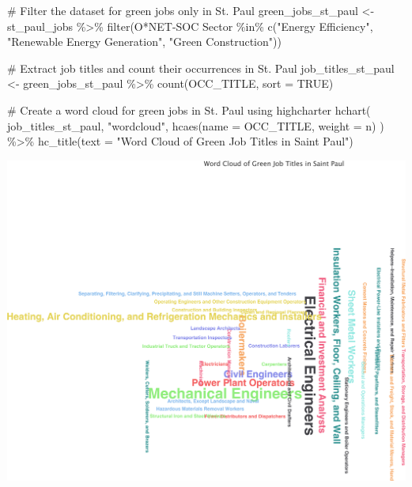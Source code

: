\documentclass[
  letterpaper,
  DIV=11,
  numbers=noendperiod]{scrartcl}
\newenvironment{Shaded}{\begin{snugshade}}{\end{snugshade}}
\newcommand{\AttributeTok}[1]{\textcolor[rgb]{0.40,0.45,0.13}{#1}}
\newcommand{\CommentTok}[1]{\textcolor[rgb]{0.37,0.37,0.37}{#1}}
\newcommand{\ConstantTok}[1]{\textcolor[rgb]{0.56,0.35,0.01}{#1}}
\newcommand{\FunctionTok}[1]{\textcolor[rgb]{0.28,0.35,0.67}{#1}}
\newcommand{\NormalTok}[1]{\textcolor[rgb]{0.00,0.23,0.31}{#1}}
\newcommand{\OtherTok}[1]{\textcolor[rgb]{0.00,0.23,0.31}{#1}}
\newcommand{\SpecialCharTok}[1]{\textcolor[rgb]{0.37,0.37,0.37}{#1}}
\newcommand{\StringTok}[1]{\textcolor[rgb]{0.13,0.47,0.30}{#1}}
\begin{document}
\begin{Shaded}
\begin{Highlighting}[]
\CommentTok{\# Filter the dataset for green jobs only in St. Paul}
\NormalTok{green\_jobs\_st\_paul }\OtherTok{\textless{}{-}}\NormalTok{ st\_paul\_jobs }\SpecialCharTok{\%\textgreater{}\%}
  \FunctionTok{filter}\NormalTok{(}\StringTok{\textasciigrave{}}\AttributeTok{O*NET{-}SOC Sector}\StringTok{\textasciigrave{}} \SpecialCharTok{\%in\%} \FunctionTok{c}\NormalTok{(}\StringTok{"Energy Efficiency"}\NormalTok{, }\StringTok{"Renewable Energy Generation"}\NormalTok{, }\StringTok{"Green Construction"}\NormalTok{))}

\CommentTok{\# Extract job titles and count their occurrences in St. Paul}
\NormalTok{job\_titles\_st\_paul }\OtherTok{\textless{}{-}}\NormalTok{ green\_jobs\_st\_paul }\SpecialCharTok{\%\textgreater{}\%}
  \FunctionTok{count}\NormalTok{(OCC\_TITLE, }\AttributeTok{sort =} \ConstantTok{TRUE}\NormalTok{)}

\CommentTok{\# Create a word cloud for green jobs in St. Paul using highcharter}
\FunctionTok{hchart}\NormalTok{(}
\NormalTok{  job\_titles\_st\_paul, }
  \StringTok{"wordcloud"}\NormalTok{, }
  \FunctionTok{hcaes}\NormalTok{(}\AttributeTok{name =}\NormalTok{ OCC\_TITLE, }\AttributeTok{weight =}\NormalTok{ n)}
\NormalTok{) }\SpecialCharTok{\%\textgreater{}\%}
  \FunctionTok{hc\_title}\NormalTok{(}\AttributeTok{text =} \StringTok{"Word Cloud of Green Job Titles in Saint Paul"}\NormalTok{)}
\end{Highlighting}
\end{Shaded}

\includegraphics{index_files/figure-pdf/unnamed-chunk-22-1.pdf}
\end{document}
